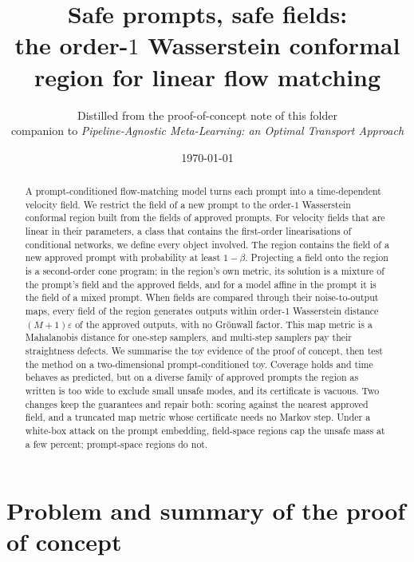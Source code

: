 \documentclass{article}
\title{Safe prompts, safe fields:\\[3pt]
\large the order-$1$ Wasserstein conformal region for linear flow matching}
\author{Distilled from the proof-of-concept note of this folder\\
companion to \emph{Pipeline-Agnostic Meta-Learning: an Optimal Transport Approach}}
\date{\today}
\theoremstyle{plain}
\theoremstyle{remark}
\begin{document}
\maketitle

\begin{abstract}
A prompt-conditioned flow-matching model turns each prompt into a time-dependent velocity
field. We restrict the field of a new prompt to the order-$1$ Wasserstein conformal region
built from the fields of approved prompts. For velocity fields that are linear in their
parameters, a class that contains the first-order linearisations of conditional networks, we
define every object involved. The region contains the field of a new
approved prompt with probability at least $1-\beta$. Projecting a field onto the region is a
second-order cone program; in the region's own metric, its solution is a mixture of the
prompt's field and the approved fields, and for a model affine in the prompt it is the field of
a mixed prompt. When fields are
compared through their noise-to-output maps, every field of the region generates outputs within
order-$1$ Wasserstein distance $(M+1)\varepsilon$ of the approved outputs, with no Gr\"onwall
factor. This map metric is a Mahalanobis distance for one-step samplers, and multi-step
samplers pay their straightness defects. We summarise the toy evidence of the proof of concept, then test the method on a two-dimensional
prompt-conditioned toy. Coverage holds and time behaves as predicted, but on a diverse family of approved
prompts the region as written is too wide to exclude small unsafe modes, and its certificate is vacuous.
Two changes keep the guarantees and repair both: scoring against the nearest approved field, and a
truncated map metric whose certificate needs no Markov step. Under a white-box attack on the prompt
embedding, field-space regions cap the unsafe mass at a few percent; prompt-space regions do not.
\end{abstract}

\section{Problem and summary of the proof of concept}\label{sec:intro}
\end{document}
